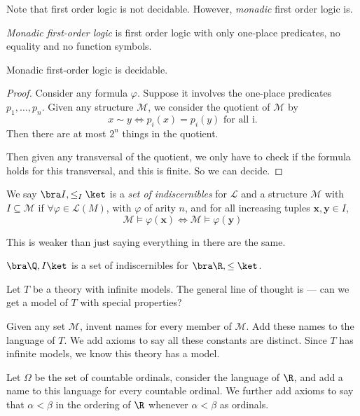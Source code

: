 \documentclass[a4paper]{article}
\begin{document}
Note that first order logic is not decidable. However, \emph{monadic} first order logic is.
\begin{defi}
  \emph{Monadic first-order logic} is first order logic with only one-place predicates, no equality and no function symbols.
\end{defi}

\begin{prop}
  Monadic first-order logic is decidable.
\end{prop}

\begin{proof}
  Consider any formula $\varphi$. Suppose it involves the one-place predicates $p_1, \dots, p_n$. Given any structure $\mathcal{M}$, we consider the quotient of $\mathcal{M}$ by
  \[
    x \sim y \Leftrightarrow p_i (x) = p_i(y) \text{ for all i}.
  \]
  Then there are at most $2^n$ things in the quotient.

  Then given any transversal of the quotient, we only have to check if the formula holds for this transversal, and this is finite. So we can decide.
\end{proof}

\begin{defi}
  We say $\bra I, \leq_I\ket$ is a \emph{set of indiscernibles} for $\mathcal{L}$ and a structure $\mathcal{M}$ with $I \subseteq \mathcal{M}$ if $\forall \varphi \in \mathcal{L}(M)$, with $\varphi$ of arity $n$, and for all increasing tuples $\mathbf{x}, \mathbf{y} \in I$,
  \[
    \mathcal{M} \vDash \varphi(\mathbf{x}) \Longleftrightarrow \mathcal{M} \vDash \varphi(\mathbf{y})
  \]
\end{defi}
This is weaker than just saying everything in there are the same.

\begin{eg}
  $\bra \Q, I\ket$ is a set of indiscernibles for $\bra \R, \leq\ket$.
\end{eg}

Let $T$ be a theory with infinite models. The general line of thought is --- can we get a model of $T$ with special properties?

Given any set $\mathcal{M}$, invent names for every member of $\mathcal{M}$. Add these names to the language of $T$. We add axioms to say all these constants are distinct. Since $T$ has infinite models, we know this theory has a model.

Let $\Omega$ be the set of countable ordinals, consider the language of $\R$, and add a name to this language for every countable ordinal. We further add axioms to say that $\alpha < \beta$ in the ordering of $\R$ whenever $\alpha < \beta$ as ordinals.
\end{document}
